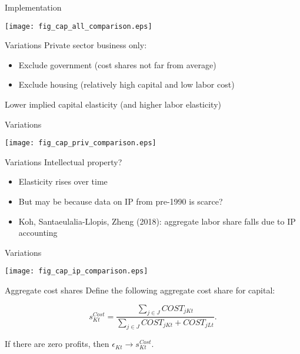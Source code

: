 \documentclass[10pt, xcolor=dvipsnames]{beamer}
\begin{document}

\begin{frame}{Implementation}
\begin{center}
\texttt{[image: fig\_cap\_all\_comparison.eps]}
\end{center}
\end{frame}


\begin{frame}{Variations}
Private sector business only:
\begin{itemize}
   \item Exclude government (cost shares not far from average)
   \item Exclude housing (relatively high capital and low labor cost)
\end{itemize} 

Lower implied capital elasticity (and higher labor elasticity)

\end{frame}

\begin{frame}{Variations}
\begin{center}
\texttt{[image: fig\_cap\_priv\_comparison.eps]}
\end{center}
\end{frame}


\begin{frame}{Variations}
Intellectual property?

\begin{itemize}
  \item Elasticity rises over time
  \item But may be because data on IP from pre-1990 is scarce?
  \item Koh, Santaeulalia-Llopis, Zheng (2018): aggregate labor share falls due to IP accounting
\end{itemize}

\end{frame}

\begin{frame}{Variations}
\begin{center}
\texttt{[image: fig\_cap\_ip\_comparison.eps]}
\end{center}
\end{frame}

\begin{frame}{Aggregate cost shares}
Define the following aggregate cost share for capital:

\begin{equation}
  s^{Cost}_{Kt} = \frac{\sum_{j \in J} COST_{jKt}}{\sum_{j \in J} COST_{jKt} + COST_{jLt}}. \label{EQ_scost}
\end{equation}

If there are zero profits, then $\epsilon_{Kt} \rightarrow s^{Cost}_{Kt}$. 

\end{frame}
\end{document}
